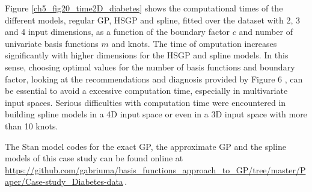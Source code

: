 \documentclass[onecolumn,a4paper,11pt]{article}
\begin{document}
Figure \ref{ch5_fig20_time2D_diabetes} shows the computational times of the different models, regular GP, HSGP and spline, fitted over the dataset with 2, 3 and 4 input dimensions, as a function of the boundary factor $c$ and number of univariate basis functions $m$ and knots. The time of omputation increases significantly with higher dimensions for the HSGP and spline models. In this sense, choosing optimal values for the number of basis functions and boundary factor, looking at the recommendations and diagnosis provided by Figure 6%
, can be essential to avoid a excessive computation time, especially in multivariate input spaces. Serious difficulties with computation time were encountered in building spline models in a 4D input space or even in a 3D input space with more than 10 knots.

The Stan model codes for the exact GP, the approximate GP and the spline models of this case study can be found online at {\small \url{https://github.com/gabriuma/basis_functions_approach_to_GP/tree/master/Paper/Case-study_Diabetes-data}}\,.
\end{document}
